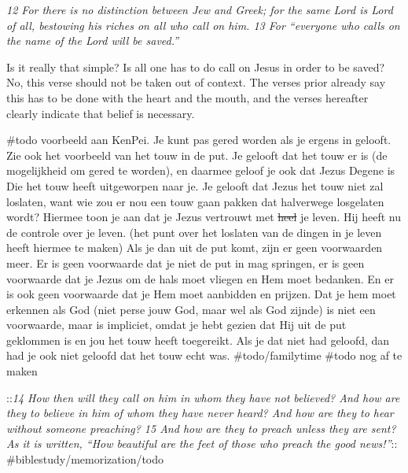 \emph{12 For there is no distinction between Jew and Greek; for the same
Lord is Lord of all, bestowing his riches on all who call on him. 13 For
``everyone who calls on the name of the Lord will be saved.''}

Is it really that simple? Is all one has to do call on Jesus in order to
be saved? No, this verse should not be taken out of context. The verses
prior already say this has to be done with the heart and the mouth, and
the verses hereafter clearly indicate that belief is necessary.

\#todo voorbeeld aan KenPei. Je kunt pas gered worden als je ergens in
gelooft. Zie ook het voorbeeld van het touw in de put. Je gelooft dat
het touw er is (de mogelijkheid om gered te worden), en daarmee geloof
je ook dat Jezus Degene is Die het touw heeft uitgeworpen naar je. Je
gelooft dat Jezus het touw niet zal loslaten, want wie zou er nou een
touw gaan pakken dat halverwege losgelaten wordt? Hiermee toon je aan
dat je Jezus vertrouwt met \sout{heel} je leven. Hij heeft nu de
controle over je leven. (het punt over het loslaten van de dingen in je
leven heeft hiermee te maken) Als je dan uit de put komt, zijn er geen
voorwaarden meer. Er is geen voorwaarde dat je niet de put in mag
springen, er is geen voorwaarde dat je Jezus om de hals moet vliegen en
Hem moet bedanken. En er is ook geen voorwaarde dat je Hem moet
aanbidden en prijzen. Dat je hem moet erkennen als God (niet perse jouw
God, maar wel als God zijnde) is niet een voorwaarde, maar is impliciet,
omdat je hebt gezien dat Hij uit de put geklommen is en jou het touw
heeft toegereikt. Als je dat niet had geloofd, dan had je ook niet
geloofd dat het touw echt was. \#todo/familytime \#todo nog af te maken

::\emph{14 How then will they call on him in whom they have not
believed? And how are they to believe in him of whom they have never
heard? And how are they to hear without someone preaching? 15 And how
are they to preach unless they are sent? As it is written, ``How
beautiful are the feet of those who preach the good news!''}::
\#biblestudy/memorization/todo

